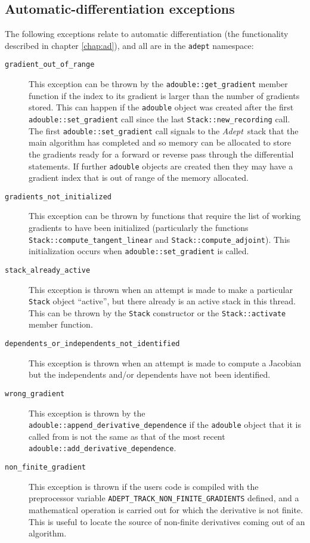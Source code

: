 \documentclass[a4,oneside]{book}
\def\codesize{\small}
\def\Adept{\emph{Adept}}
\def\code#1{{\codesize\texttt{#1}}}
\def\citem#1{\item[{\codesize\texttt{#1}}]}
\begin{document}
\subsection{Automatic-differentiation exceptions}
The following exceptions relate to automatic differentiation (the
functionality described in chapter \ref{chap:ad}), and all are in the
\code{adept} namespace:
\begin{description}
\citem{gradient\_out\_of\_range} This exception can be thrown by the
\code{adouble::get\_gradient} member function if the index to its
gradient is larger than the number of gradients stored.  This can
happen if the \code{adouble} object was created after the first
\code{adouble::set\_gradient} call since the last
\code{Stack::new\_recording} call. The first
\code{adouble::set\_gradient} call signals to the \Adept\ stack that
the main algorithm has completed and so memory can be allocated to
store the gradients ready for a forward or reverse pass through the
differential statements. If further \code{adouble} objects are created
then they may have a gradient index that is out of range of the memory
allocated.
%
\citem{gradients\_not\_initialized} This exception can be thrown by
functions that require the list of working gradients to have been
initialized (particularly the functions
\code{Stack::compute\_tangent\_linear} and
\code{Stack::compute\_adjoint}). This initialization occurs when
\code{adouble::set\_gradient} is called.
%
\citem{stack\_already\_active} This exception is thrown when an
attempt is made to make a particular \code{Stack} object ``active'',
but there already is an active stack in this thread. This can be
thrown by the \code{Stack} constructor or the \code{Stack::activate}
member function.
%
\citem{dependents\_or\_independents\_not\_identified} This exception
is thrown when an attempt is made to compute a Jacobian but the
independents and/or dependents have not been identified.
%
\citem{wrong\_gradient} This exception is thrown by the
\code{adouble::append\_derivative\_dependence} if the \code{adouble}
object that it is called from is not the same as that of the most
recent \code{adouble::add\_derivative\_dependence}. 
%
\citem{non\_finite\_gradient} This exception is thrown if the users
code is compiled with the preprocessor variable
\code{ADEPT\_TRACK\_NON\_FINITE\_GRADIENTS} defined, and a
mathematical operation is carried out for which the derivative is not
finite. This is useful to locate the source of non-finite derivatives
coming out of an algorithm.
\end{description}
\end{document}
